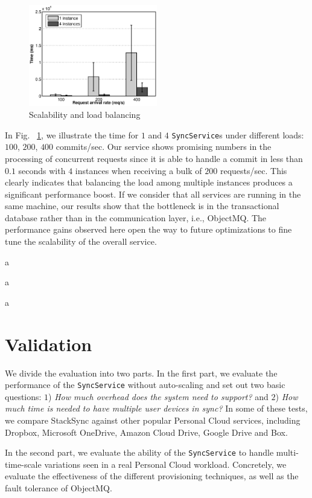 \begin{figure}[t]
\centering
\includegraphics[width=0.5\textwidth]{figures/performance_scalability}
\caption{Scalability and load balancing}\label{fig:scalability}
\end{figure}


In Fig. ~\ref{fig:scalability}, we illustrate the time for $1$ and $4$ \texttt{SyncService}s under different
loads: $100$, $200$, $400$ commits/sec. Our service shows promising numbers in the processing of concurrent
requests since it is able to handle a commit in less than $0.1$ seconds with $4$ instances when receiving
a bulk of $200$ requests/sec. This clearly indicates that balancing the load
among multiple instances produces a significant performance boost. If we consider that all services are
running in the same machine, our results show that the bottleneck is in the transactional database
rather than in the communication layer, i.e., ObjectMQ. The performance gains observed here open the
way to future optimizations to fine tune the scalability of the overall service. 



a

a

a

\section{Validation}

We divide the evaluation into two parts. In the first part, we evaluate the performance of the
\texttt{SyncService} without auto-scaling and set out two basic questions: 
$1$) \textit{How much overhead does the system need to support?} and $2$) \textit{How much time is needed to have multiple user devices in sync?}
In some of these tests, we compare StackSync against other popular Personal Cloud services, including Dropbox, Microsoft OneDrive, Amazon Cloud Drive, 
Google Drive and Box.

In the second part, we evaluate the ability of the \texttt{SyncService} to handle multi-time-scale variations
seen in a real Personal Cloud workload. Concretely, we evaluate the effectiveness of the different provisioning techniques, as well as
the fault tolerance of ObjectMQ.

